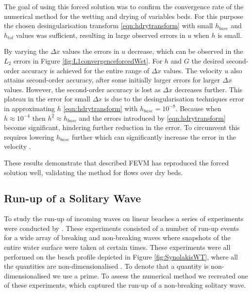 \documentclass[AMA,STIX1COL]{WileyNJD-v2}
\begin{document}
The goal of using this forced solution was to confirm the convergence rate of the numerical method for the wetting and drying of variables beds. For this purpose the chosen desingularisation transform \eqref{eqn:hdrytransform} with small $h_{{base}}$ and $h_{{tol}}$ values was sufficient, resulting in large observed errors in $u$ when $h$ is small.

By varying the $\Delta x$ values the errors in $u$ decrease, which can be observed in the $L_2$ errors in Figure \ref{fig:L1convergenceforcedWet}. For $h$ and $G$ the desired second-order accuracy is achieved for the entire range of $\Delta x$ values. The velocity $u$ also attains second-order accuracy, after some initially larger errors for larger $\Delta x$ values. However, the second-order accuracy is lost as $\Delta x$ decreases further. This plateau in the error for small $\Delta x$ is due to the desingularisation techniques error in approximating $h$ \eqref{eqn:hdrytransform} with $h_{{base}} = 10^{-8}$. Because when $h \approx 10^{-4}$ then $h^2 \approx h_{base}$ and the errors introduced by \eqref{eqn:hdrytransform} become significant, hindering further reduction in the error. To circumvent this requires lowering $h_{base}$ further which can significantly increase the error in the velocity \cite{Kurganov-Petrova-2007-707}.

These results demonstrate that described FEVM has reproduced the forced solution well, validating the method for flows over dry beds. 

\subsection{Run-up of a Solitary Wave}

To study the run-up of incoming waves on linear beaches a series of experiments were conducted by \citet{Synolakis-1987-523}. These experiments consisted of a number of run-up events for a wide array of breaking and non-breaking waves where snapshots of the entire water surface were taken at certain times. These experiments were all performed on the beach profile depicted in Figure \ref{fig:SynolakisWT}, where all the quantities are non-dimensionalised \cite{Synolakis-1987-523}. To denote that a quantity is non-dimensionalised we use a prime. To assess the numerical method we recreated one of these experiments, which captured the run-up of a non-breaking solitary wave.
\end{document}
